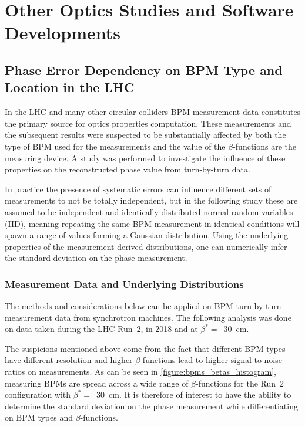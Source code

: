 \chapter{Other Optics Studies and Software Developments}
\label{chapter:Others_and_Software}


\section{Phase Error Dependency on BPM Type and Location in the LHC}

In the LHC and many other circular colliders BPM measurement data constitutes the primary source for optics properties computation.
These measurements and the subsequent results were suspected to be substantially affected by both the type of BPM used for the measurements and the value of the \(\beta\)-functions are the measuring device.
A study was performed to investigate the influence of these properties on the reconstructed phase value from turn-by-turn data.

In practice the presence of systematic errors can influence different sets of measurements to not be totally independent, but in the following study these are assumed to be independent and identically distributed normal random variables (IID), meaning repeating the same BPM measurement in identical conditions will spawn a range of values forming a Gaussian distribution.
Using the underlying properties of the measurement derived distributions, one can numerically infer the standard deviation on the phase measurement.

\subsection{Measurement Data and Underlying Distributions}

The methods and considerations below can be applied on BPM turn-by-turn measurement data from synchrotron machines.
The following analysis was done on data taken during the LHC Run~\num{2}, in \num{2018} and at \(\beta^{\ast} =\)~\qty{30}{\centi\meter}.

The suspicions mentioned above come from the fact that different BPM types have different resolution and higher \(\beta\)-functions lead to higher signal-to-noise ratios on measurements.
As can be seen in \cref{figure:bpms_betas_histogram}, measuring BPMs are spread across a wide range of \(\beta\)-functions for the Run~\num{2} configuration with \(\beta^{\ast} =\)~\qty{30}{\centi\meter}.
It is therefore of interest to have the ability to determine the standard deviation on the phase measurement while differentiating on BPM types and \(\beta\)-functions.

